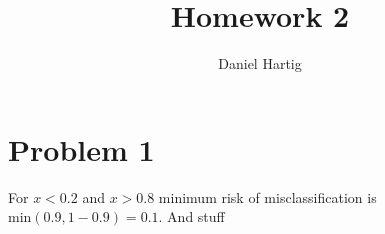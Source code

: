 \documentclass{article}
\title{Homework 2}
\author{Daniel Hartig}
\begin{document}
\maketitle

\section*{Problem 1}

For $x < 0.2$ and $x > 0.8$ minimum risk of misclassification is $\text{min}(0.9, 1-0.9) = 0.1$. And stuff
\end{document}
